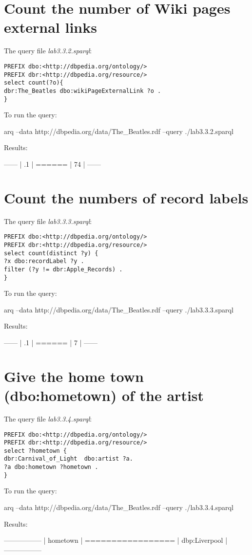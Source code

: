 \documentclass[a4paper, 12pt]{report}
\begin{document}
\section{Count the number of Wiki pages external links}
The query file \emph{lab3.3.2.sparql}:
\begin{lstlisting}[frame=single]
PREFIX dbo:<http://dbpedia.org/ontology/>
PREFIX dbr:<http://dbpedia.org/resource/>
select count(?o){
dbr:The_Beatles dbo:wikiPageExternalLink ?o .
}
\end{lstlisting}
To run the query:
\begin{commandshell}
arq --data http://dbpedia.org/data/The_Beatles.rdf --query ./lab3.3.2.sparql
\end{commandshell}
Results:
\begin{messageshell}
------
| .1 |
======
| 74 |
------
\end{messageshell}

\section{Count the numbers of record labels}
The query file \emph{lab3.3.3.sparql}:
\begin{lstlisting}[frame=single]
PREFIX dbo:<http://dbpedia.org/ontology/>
PREFIX dbr:<http://dbpedia.org/resource/>
select count(distinct ?y) {
?x dbo:recordLabel ?y .
filter (?y != dbr:Apple_Records) .
}
\end{lstlisting}
To run the query:
\begin{commandshell}
arq --data http://dbpedia.org/data/The_Beatles.rdf --query ./lab3.3.3.sparql
\end{commandshell}
Results:
\begin{messageshell}
------
| .1 |
======
| 7  |
------
\end{messageshell}

\section{Give the home town (dbo:hometown) of the artist}
The query file \emph{lab3.3.4.sparql}:
\begin{lstlisting}[frame=single]
PREFIX dbo:<http://dbpedia.org/ontology/>
PREFIX dbr:<http://dbpedia.org/resource/>
select ?hometown {
dbr:Carnival_of_Light  dbo:artist ?a.
?a dbo:hometown ?hometown .
}
\end{lstlisting}
To run the query:
\begin{commandshell}
arq --data http://dbpedia.org/data/The_Beatles.rdf --query ./lab3.3.4.sparql
\end{commandshell}
Results:
\begin{messageshell}
-----------------
| hometown      |
=================
| dbp:Liverpool |
-----------------
\end{messageshell}
\end{document}
